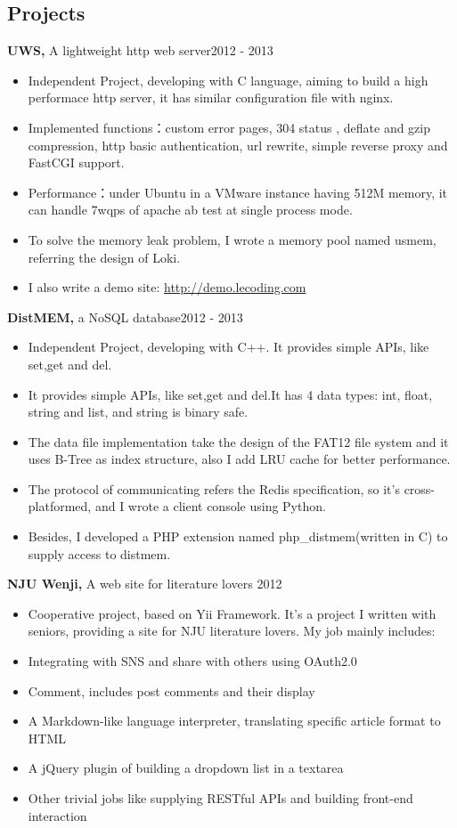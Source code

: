 \documentclass[margin]{res}
\begin{document}
\begin{resume}
\section{Projects}
{\bf UWS,} A lightweight http web server\hfill 2012 - 2013
\begin{itemize} \itemsep -2pt
  \item Independent Project, developing with C language, aiming to build a high performace http server, it has similar configuration file with nginx.
  \item Implemented functions：custom error pages, 304 status , deflate and gzip compression, http basic authentication, url rewrite, simple reverse proxy and FastCGI support.
  \item Performance：under Ubuntu in a VMware instance having 512M memory, it can handle 7wqps of apache ab test at single process mode.
  \item To solve the memory leak problem, I wrote a memory pool named usmem, referring the design of Loki.
  \item I also write a demo site: \href{http://demo.lecoding.com}{http://demo.lecoding.com}
\end{itemize}



{\bf DistMEM,} a NoSQL database\hfill  2012 - 2013
\begin{itemize} \itemsep -2pt
  \item Independent Project, developing with C++. It provides simple APIs, like set,get and del.
  \item It provides simple APIs, like set,get and del.It has 4 data types: int, float, string and list, and string is binary safe.
  \item The data file implementation take the design of the FAT12 file system and it uses B-Tree as index structure, also I add LRU cache for better performance. 
  \item The protocol of communicating refers the Redis specification, so it's cross-platformed, and I wrote a client console using Python.
  \item Besides, I developed a PHP extension named php\_distmem(written in C) to supply access to distmem.
\end{itemize}

{\bf NJU Wenji,} A web site for literature lovers \hfill 2012
\begin{itemize} \itemsep -2pt
  \item Cooperative project, based on Yii Framework. It's a project I written with seniors, providing a site for NJU literature lovers. My job mainly includes:
  \item Integrating with SNS and share with others using OAuth2.0
  \item Comment, includes post comments and their display
  \item A Markdown-like language interpreter, translating specific article format to HTML
  \item A jQuery plugin of building a dropdown list in a textarea
  \item Other trivial jobs like supplying RESTful APIs and building front-end interaction
\end{itemize}


\end{resume}
\end{document}
